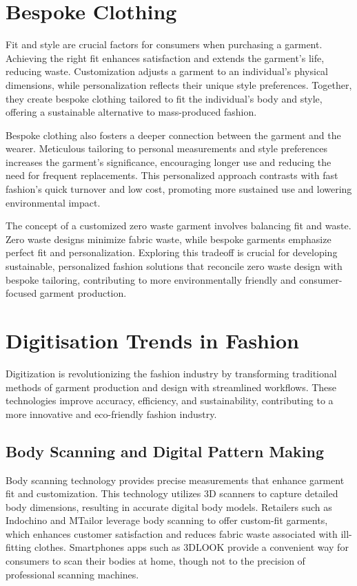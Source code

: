 \section{Bespoke Clothing}
Fit and style are crucial factors for consumers when purchasing a garment. Achieving the right fit enhances satisfaction and extends the garment's life, reducing waste. Customization adjusts a garment to an individual's physical dimensions, while personalization reflects their unique style preferences. Together, they create bespoke clothing tailored to fit the individual's body and style, offering a sustainable alternative to mass-produced fashion.

Bespoke clothing also fosters a deeper connection between the garment and the wearer. Meticulous tailoring to personal measurements and style preferences increases the garment's significance, encouraging longer use and reducing the need for frequent replacements. This personalized approach contrasts with fast fashion's quick turnover and low cost, promoting more sustained use and lowering environmental impact.

The concept of a customized zero waste garment involves balancing fit and waste. Zero waste designs minimize fabric waste, while bespoke garments emphasize perfect fit and personalization. Exploring this tradeoff is crucial for developing sustainable, personalized fashion solutions that reconcile zero waste design with bespoke tailoring, contributing to more environmentally friendly and consumer-focused garment production.

\section{Digitisation Trends in Fashion}
Digitization is revolutionizing the fashion industry by transforming traditional methods of garment production and design with streamlined workflows. These technologies improve accuracy, efficiency, and sustainability, contributing to a more innovative and eco-friendly fashion industry.

\subsection{Body Scanning and Digital Pattern Making}
Body scanning technology provides precise measurements that enhance garment fit and customization. This technology utilizes 3D scanners to capture detailed body dimensions, resulting in accurate digital body models. Retailers such as Indochino and MTailor leverage body scanning to offer custom-fit garments, which enhances customer satisfaction and reduces fabric waste associated with ill-fitting clothes. Smartphones apps such as 3DLOOK provide a convenient way for consumers to scan their bodies at home, though not to the precision of professional scanning machines.

